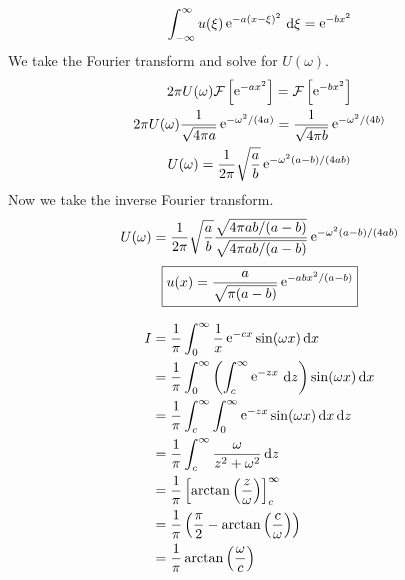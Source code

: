 {%
\begin{Solution}
  \label{solution ode ft int eqn u eaxxi2}
  \[
  \int_{-\infty}^\infty u(\xi) \mathop{\mathrm{e}}\nolimits^{-a (x-\xi)^2 } \,\mathrm{d} \xi = \mathop{\mathrm{e}}\nolimits^{-b x^2 }
  \]
  We take the Fourier transform and solve for $U(\omega)$.
  \begin{gather*}
    2 \pi U(\omega) \mathcal{F}\left[ \mathop{\mathrm{e}}\nolimits^{-a x^2} \right]
    = \mathcal{F}\left[ \mathop{\mathrm{e}}\nolimits^{-b x^2} \right] \\
    2 \pi U(\omega) \frac{1}{ \sqrt{ 4 \pi a } } \mathop{\mathrm{e}}\nolimits^{- \omega^2/(4a) }
    = \frac{1}{ \sqrt{ 4 \pi b } } \mathop{\mathrm{e}}\nolimits^{- \omega^2/(4b) } \\
    U(\omega) = \frac{1}{2\pi} \sqrt{ \frac{a}{b} } \mathop{\mathrm{e}}\nolimits^{- \omega^2 (a-b)/(4 a b)}
  \end{gather*}
  Now we take the inverse Fourier transform.
  \[
  U(\omega) = \frac{1}{2\pi} \sqrt{ \frac{a}{b} } 
  \frac{ \sqrt{ 4 \pi a b / (a-b) } }{ \sqrt{ 4 \pi a b / (a-b) } }
  \mathop{\mathrm{e}}\nolimits^{- \omega^2 (a-b)/(4 a b)}
  \]
  \[
  \boxed{
    u(x) = \frac{ a }{ \sqrt{ \pi (a-b) } } \mathop{\mathrm{e}}\nolimits^{- a b x^2 / (a-b) }
    }
  \]
\end{Solution}



\begin{Solution}
  \label{solution ode ft fst e-cx/x}
  \begin{align*}
    I       &= \frac{1}{\pi} \int_0^\infty \frac{1}{x} \mathop{\mathrm{e}}\nolimits^{- c x} \sin(\omega x) \,\mathrm{d} x \\
    &= \frac{1}{\pi} \int_0^\infty \left( \int_c^\infty \mathop{\mathrm{e}}\nolimits^{- z x} \,\mathrm{d} z \right)
    \sin(\omega x) \,\mathrm{d} x \\
    &= \frac{1}{\pi} \int_c^\infty \int_0^\infty \mathop{\mathrm{e}}\nolimits^{- z x} 
    \sin(\omega x) \,\mathrm{d} x \,\mathrm{d} z \\
    &= \frac{1}{\pi} \int_c^\infty \frac{\omega}{z^2 + \omega^2} \,\mathrm{d} z \\
    &= \frac{1}{\pi} \left[ \arctan \left( \frac{z}{\omega} \right)
    \right]_c^\infty \\
    &= \frac{1}{\pi} \left( \frac{\pi}{2} 
      - \arctan \left( \frac{c}{\omega} \right) \right) \\
    &= \frac{1}{\pi} \arctan \left( \frac{\omega}{c} \right) 
  \end{align*}
\end{Solution}








}
